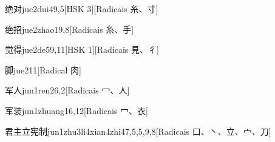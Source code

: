 \begin{entry}{绝对}{jue2dui4}{9,5}[HSK 3][Radicais ⽷、⼨]
\end{entry}

\begin{entry}{绝招}{jue2zhao1}{9,8}[Radicais ⽷、⼿]
\end{entry}

\begin{entry}{觉得}{jue2de5}{9,11}[HSK 1][Radicais ⾒、⼻]
\end{entry}

\begin{entry}{脚}{jue2}{11}[Radical ⾁]
\end{entry}

\begin{entry}{军人}{jun1ren2}{6,2}[Radicais ⼍、⼈]
\end{entry}

\begin{entry}{军装}{jun1zhuang1}{6,12}[Radicais ⼍、⾐]
\end{entry}

\begin{entry}{君主立宪制}{jun1zhu3li4xian4zhi4}{7,5,5,9,8}[Radicais ⼝、⼂、⽴、⼧、⼑]
\end{entry}


